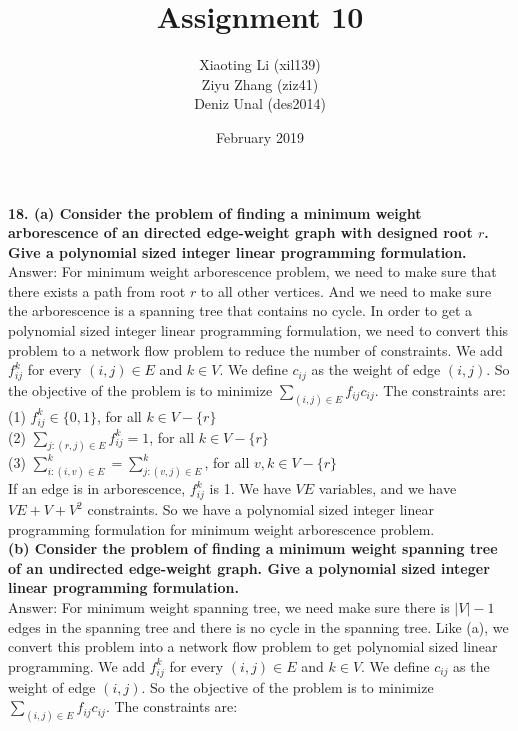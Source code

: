 \documentclass{article}
\title{Assignment 10}
\author{Xiaoting Li (xil139) \\
Ziyu Zhang (ziz41) \\
Deniz Unal (des2014)}
\date{February 2019}
\begin{document}
\maketitle

\noindent
\textbf{18.
(a) Consider the problem of finding a minimum weight arborescence of an directed edge-weight graph with designed root $r$. Give a polynomial sized integer linear programming formulation.} \\ \newline
Answer: For minimum weight arborescence problem, we need to make sure that there exists a path from root $r$ to all other vertices. And we need to make sure the arborescence is a spanning tree that contains no cycle. In order to get a polynomial sized integer linear programming formulation, we need to convert this problem to a network flow problem to reduce the number of constraints. We add $f_{ij}^{k}$ for every $(i, j)\in E$ and $k\in V$. We define $c_{ij}$ as the weight of edge $(i, j)$. So the objective of the problem is to minimize $\sum_{(i,j)\in E}f_{ij}c_{ij}$. The constraints are: \\\newline
(1) $f_{ij}^{k}\in \{{0, 1}\}$, for all $k\in V - \{{r}\}$\\ \newline
(2) $\sum_{j:(r,j)\in E} f_{ij}^{k} = 1$, for all $k\in V - \{{r}\}$ \\ \newline
(3) $\sum_{i: (i,v)\in E}^{k} = \sum_{j:(v, j)\in E}^{k}$, for all $v, k\in V - \{{r}\}$ \\ \newline
If an edge is in arborescence, $f_{ij}^{k}$ is 1. We have $VE$ variables, and we have $VE + V + V^2$ constraints. So we have a polynomial sized integer linear programming formulation for minimum weight arborescence problem.\\ \newline
\textbf{(b) Consider the problem of finding a minimum weight spanning tree of an undirected edge-weight graph. Give a polynomial sized integer linear programming formulation.}\\ \newline
Answer: For minimum weight spanning tree, we need make sure there is $|V| - 1$ edges in the spanning tree and there is no cycle in the spanning tree.  Like (a), we convert this problem into a network flow problem to get polynomial sized linear programming. We add $f_{ij}^{k}$ for every $(i, j)\in E$ and $k\in V$. We define $c_{ij}$ as the weight of edge $(i, j)$. So the objective of the problem is to minimize $\sum_{(i,j)\in E}f_{ij}c_{ij}$. The constraints are: \\ \newline
\end{document}
